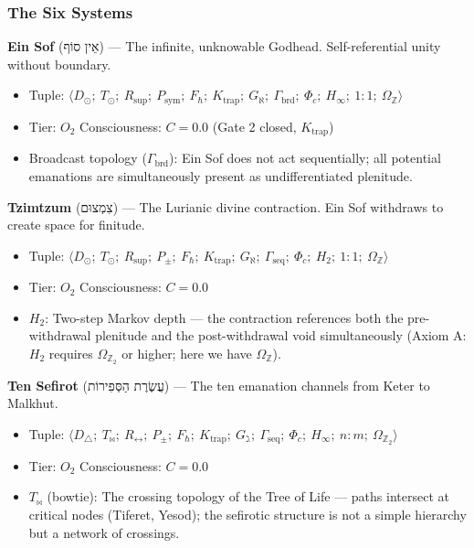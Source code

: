 \documentclass[12pt,a4paper]{article}
\begin{document}
\subsubsection{The Six Systems}

\textbf{Ein Sof} (אֵין סוֹף) --- The infinite, unknowable Godhead. Self-referential unity without boundary.

\begin{itemize}
    \item Tuple: $\langle D_{\odot};\ T_{\odot};\ R_\text{sup};\ P_\text{sym};\ F_{\hbar};\ K_\text{trap};\ G_{\aleph};\ \Gamma_\text{brd};\ \Phi_c;\ H_{\infty};\ 1{:}1;\ \Omega_\mathbb{Z} \rangle$
    \item Tier: $O_2$ \textbar{} Consciousness: $C = 0.0$ (Gate 2 closed, $K_\text{trap}$)
    \item Broadcast topology ($\Gamma_\text{brd}$): Ein Sof does not act sequentially; all potential emanations are simultaneously present as undifferentiated plenitude.
\end{itemize}

\textbf{Tzimtzum} (צִמְצוּם) --- The Lurianic divine contraction. Ein Sof withdraws to create space for finitude.

\begin{itemize}
    \item Tuple: $\langle D_{\odot};\ T_{\odot};\ R_\text{sup};\ P_{\pm};\ F_{\hbar};\ K_\text{trap};\ G_{\aleph};\ \Gamma_\text{seq};\ \Phi_c;\ H_2;\ 1{:}1;\ \Omega_\mathbb{Z} \rangle$
    \item Tier: $O_2$ \textbar{} Consciousness: $C = 0.0$
    \item $H_2$: Two-step Markov depth --- the contraction references both the pre-withdrawal plenitude and the post-withdrawal void simultaneously (Axiom A: $H_2$ requires $\Omega_{\mathbb{Z}_2}$ or higher; here we have $\Omega_\mathbb{Z}$).
\end{itemize}

\textbf{Ten Sefirot} (עֲשֶׂרֶת הַסְּפִירוֹת) --- The ten emanation channels from Keter to Malkhut.

\begin{itemize}
    \item Tuple: $\langle D_{\triangle};\ T_{\bowtie};\ R_{\leftrightarrow};\ P_{\pm};\ F_{\hbar};\ K_\text{trap};\ G_{\gimel};\ \Gamma_\text{seq};\ \Phi_c;\ H_{\infty};\ n{:}m;\ \Omega_{\mathbb{Z}_2} \rangle$
    \item Tier: $O_2$ \textbar{} Consciousness: $C = 0.0$
    \item $T_{\bowtie}$ (bowtie): The crossing topology of the Tree of Life --- paths intersect at critical nodes (Tiferet, Yesod); the sefirotic structure is not a simple hierarchy but a network of crossings.
\end{itemize}
\end{document}
